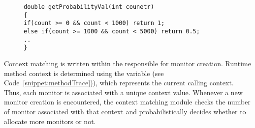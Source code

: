 \begin{figure}[t]
\begin{lstlisting}
double getProbabilityVal(int counetr)
{
if(count >= 0 && count < 1000) return 1;
else if(count >= 1000 && count < 5000) return 0.5;
..
}
\end{lstlisting}
\end{figure}

 Context matching is written within the 
 responsible for monitor creation. Runtime method context is 
determined using the  variable (see 
Code~\ref{snippet:methodTrace})), which represents the current calling context. 
Thus, each monitor is associated with a unique context value. Whenever a new 
monitor creation  is encountered, the context matching module 
checks the number of monitor associated with that context and probabilistically 
decides whether to allocate more monitors or not.

